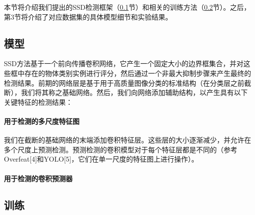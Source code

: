\documentclass[../main.tex]{subfile}
\begin{document}
本节将介绍我们提出的SSD检测框架（\ref{sec:model}节）和相关的训练方法（\ref{sec:training}节）。之后，第3节将介绍了对应数据集的具体模型细节和实验结果。

\subsection{模型} \label{sec:model}

SSD方法基于一个前向传播卷积网络，它产生一个固定大小的边界框集合，并对这些框中存在的物体类别实例进行评分，然后通过一个非最大抑制步骤来产生最终的检测结果。前期的网络层是基于用于高质量图像分类的标准结构（在分类层之前截断），我们将其称之基础网络。然后，我们向网络添加辅助结构，以产生具有以下关键特征的检测结果：

\paragraph{用于检测的多尺度特征图} 我们在截断的基础网络的末端添加卷积特征层。这些层的大小逐渐减少，并允许在多个尺度上预测检测。预测检测的卷积模型对于每个特征层都是不同的（参考Overfeat[4]和YOLO[5]，它们在单一尺度的特征图上进行操作）。

\paragraph{用于检测的卷积预测器}

\subsection{训练} \label{sec:training}
\end{document}
